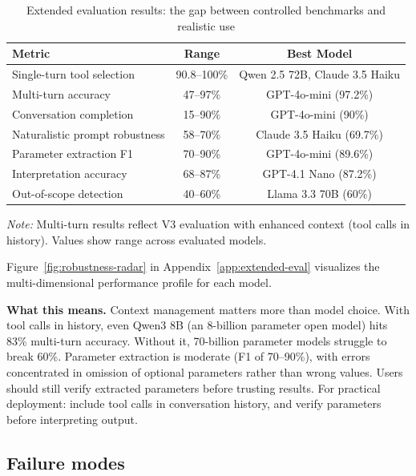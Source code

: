 \begin{table}[htbp]
\centering
\begin{threeparttable}
\caption{Extended evaluation results: the gap between controlled benchmarks and realistic use}
\label{tab:extended-eval-summary-main}
\small
\begin{tabular}{lcc}
\toprule
Metric & Range & Best Model \\
\midrule
Single-turn tool selection & 90.8--100\% & Qwen 2.5 72B, Claude 3.5 Haiku \\
Multi-turn accuracy & 47--97\% & GPT-4o-mini (97.2\%) \\
Conversation completion & 15--90\% & GPT-4o-mini (90\%) \\
Naturalistic prompt robustness & 58--70\% & Claude 3.5 Haiku (69.7\%) \\
Parameter extraction F1 & 70--90\% & GPT-4o-mini (89.6\%) \\
Interpretation accuracy & 68--87\% & GPT-4.1 Nano (87.2\%) \\
Out-of-scope detection & 40--60\% & Llama 3.3 70B (60\%) \\
\bottomrule
\end{tabular}
\begin{tablenotes}\small
\item \emph{Note:} Multi-turn results reflect V3 evaluation with enhanced
context (tool calls in history). Values show range across evaluated models.
\end{tablenotes}
\end{threeparttable}
\end{table}

Figure~\ref{fig:robustness-radar} in Appendix~\ref{app:extended-eval}
visualizes the multi-dimensional performance profile for each model.

\textbf{What this means.} Context management matters more than model choice.
With tool calls in history, even Qwen3 8B (an 8-billion parameter open model)
hits 83\% multi-turn accuracy. Without it, 70-billion parameter models struggle
to break 60\%. Parameter extraction is moderate (F1 of 70--90\%), with
errors concentrated in omission of optional parameters rather than wrong
values. Users should still verify extracted parameters before trusting
results. For practical deployment: include tool calls in conversation
history, and verify parameters before interpreting output.

\subsection{Failure modes}

